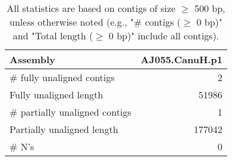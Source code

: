 \documentclass[12pt,a4paper]{article}
\begin{document}
\begin{table}[ht]
\begin{center}
\caption{All statistics are based on contigs of size $\geq$ 500 bp, unless otherwise noted (e.g., "\# contigs ($\geq$ 0 bp)" and "Total length ($\geq$ 0 bp)" include all contigs).}
\begin{tabular}{|l*{1}{|r}|}
\hline
Assembly & AJ055.CanuH.p1 \\ \hline
\# fully unaligned contigs & 2 \\ \hline
Fully unaligned length & 51986 \\ \hline
\# partially unaligned contigs & 1 \\ \hline
Partially unaligned length & 177042 \\ \hline
\# N's & 0 \\ \hline
\end{tabular}
\end{center}
\end{table}
\end{document}

